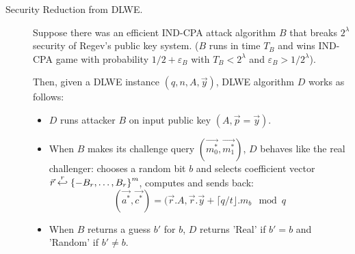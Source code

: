 \begin{description}
\begin{description}
                    \begin{description}
                        \item[Security Reduction from DLWE.] Suppose there was
                            an efficient IND-CPA attack algorithm $B$ that
                            breaks $2^\lambda$ security of Regev's public key
                            system. ($B$ runs in time $T_B$ and wins IND-CPA
                                game with probability $1/2 + \varepsilon_B$
                                    with $T_B < 2^\lambda$ and $\varepsilon_B >
                            1/2^\lambda$).

                            Then, given a DLWE instance $(q,n,A,\vec{y})$, DLWE
                            algorithm $D$ works as follows:
                            \begin{itemize}
                                \item $D$ runs attacker $B$ on input public key
                                    $(A, \vec{p} = \vec{y})$.
                                \item When $B$ makes its challenge query
                                $(\vec{m_0^*}, \vec{m_1^*})$, $D$ behaves
                                like the real challenger: chooses a random bit
                                $b$ and selects coefficient vector
                                $\vec{r} \stackrel{r}{\hookleftarrow} \left\{ -B_r, \dots, B_r
                                \right\}^m$, computes and sends back:
                                \[
                                    (\vec{a^*}, \vec{c^*}) = (\vec{r}.A,
                                        \vec{r}.\vec{y} + \lceil q/t \rfloor .
                                        m_b \mod q
                                \]
                            \item When $B$ returns a guess $b'$ for $b$,
                                $D$ returns 'Real' if $b'=b$ and 'Random' if
                                $b' \neq b$.
                            \end{itemize}


\end{description}
\end{description}
\end{description}
